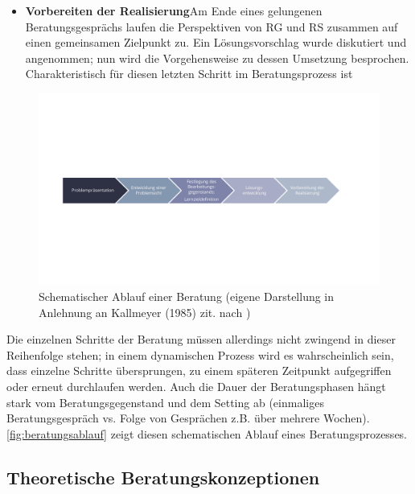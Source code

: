 \documentclass[
  twoside,
  parskip=half-,
]{scrreprt}
\begin{document}
\begin{itemize}
  \item \textbf{Vorbereiten der Realisierung}\quad Am Ende eines gelungenen Beratungsgesprächs laufen die Perspektiven von RG und RS zusammen auf einen gemeinsamen Zielpunkt zu. Ein Lösungsvorschlag wurde diskutiert und angenommen; nun wird die Vorgehensweise zu dessen Umsetzung besprochen. Charakteristisch für diesen letzten Schritt im Beratungsprozess ist 
\end{itemize}

\begin{figure}
  \centering
  \includegraphics[width=\textwidth]{Grafiken/Beratungsablauf.pdf}
  \caption{Schematischer Ablauf einer Beratung (eigene Darstellung in Anlehnung an Kallmeyer (1985) zit. nach \textcite[179]{dinkelaker})}
  \label{fig:beratungsablauf}
\end{figure}

Die einzelnen Schritte der Beratung müssen allerdings nicht zwingend in dieser Reihenfolge stehen; in einem dynamischen Prozess wird es wahrscheinlich sein, dass einzelne Schritte übersprungen, zu einem späteren Zeitpunkt aufgegriffen oder erneut durchlaufen werden. Auch die Dauer der Beratungsphasen hängt stark vom Beratungsgegenstand und dem Setting ab (einmaliges Beratungsgespräch vs. Folge von Gesprächen z.B. über mehrere Wochen). \autoref{fig:beratungsablauf} zeigt diesen schematischen Ablauf eines Beratungsprozesses.

\subsection{Theoretische Beratungskonzeptionen}
\end{document}
